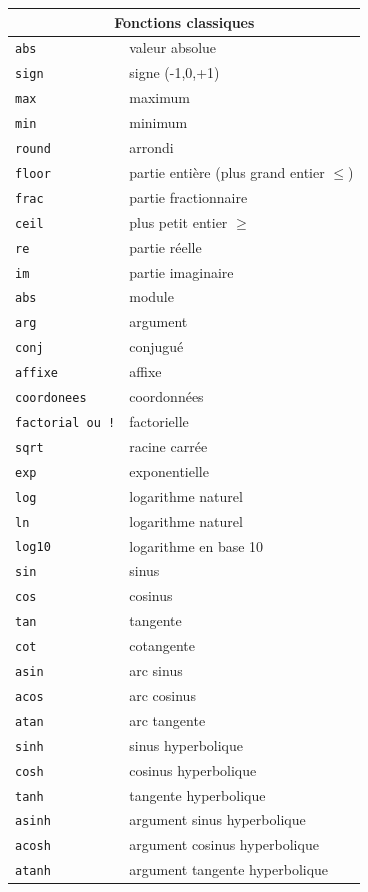 \documentclass{article}
\begin{document}
\begin{center}
\begin{tabular}{|ll|}
\hline
\multicolumn{2}{|c|}{\bf Fonctions classiques}\\
\hline\hline
\verb|abs| & valeur absolue\\
\verb|sign| & signe (-1,0,+1)\\
\verb|max| & maximum\\
\verb|min| & minimum\\
\verb|round| & arrondi \\
\verb|floor| & partie enti\`ere (plus grand entier $\leq$)\\
\verb|frac| & partie fractionnaire\\
\verb|ceil| & plus petit entier $\geq $\\
\hline
\verb|re| & partie r\'eelle\\
\verb|im| & partie imaginaire\\
\verb|abs| & module\\
\verb|arg| & argument\\
\verb|conj| & conjugu\'e\\
\verb|affixe| & affixe\\
\verb|coordonees| & coordonn\'ees\\
\hline
\verb|factorial ou !| & factorielle\\
\verb|sqrt| & racine carr\'ee\\
\verb|exp| & exponentielle\\
\verb|log| & logarithme naturel\\
\verb|ln| & logarithme naturel\\
\verb|log10| & logarithme en base 10\\
\hline
\verb|sin| & sinus\\
\verb|cos| & cosinus\\
\verb|tan| & tangente\\
\verb|cot| & cotangente\\
\verb|asin| & arc sinus\\
\verb|acos| & arc cosinus\\
\verb|atan| & arc tangente\\
\hline
\verb|sinh| & sinus hyperbolique\\
\verb|cosh| & cosinus hyperbolique\\
\verb|tanh| & tangente hyperbolique\\
\verb|asinh| & argument sinus hyperbolique\\
\verb|acosh| & argument cosinus hyperbolique\\
\verb|atanh| & argument tangente hyperbolique\\
\hline
\end{tabular}
\end{center}
\end{document}
